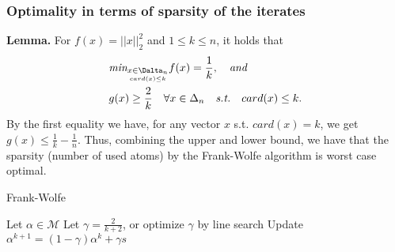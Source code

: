 \documentclass{article}
\begin{document}
\subsubsection{Optimality in terms of sparsity of the iterates}
\textbf{Lemma.} For $f(x)= ||x||_{2}^{2}$ and $1\leq k\leq n$, it holds that
\begin{equation*}
\begin{aligned}
      &\textit{min}_{\underset{card(x)\leq
      k}{x\in\Dalta_{n}}}f(x)= \frac{1}{k},\quad\textit{and}\\
      &g(x)\geq \frac{2}{k}\quad\forall x\in\Delta_{n}\quad\textit{s.t.}\quad card(x)\leq k. 
\end{aligned}    
\end{equation*}
By the first equality we have, for any vector $x$ s.t. $card(x)= k$, we get $g(x)\leq \frac{1}{k}- \frac{1}{n}$.
Thus, combining the upper and lower bound, we have that the sparsity (number of used atoms) by the Frank-Wolfe algorithm is worst case optimal.
\begin{algorithm}[tb]
   \caption{Frank-Wolfe}
   \label{alg:example}
\begin{algorithmic}
   \STATE Let $\alpha\in\mathcal{M}$
   \STATE Let $\gamma = \frac{2}{k+2}$, or optimize $\gamma$ by line search
   \STATE Update $\alpha^{k+1}= (1-\gamma)\alpha^{k}+ \gamma s$
   \ENDFOR
\end{algorithmic}
\end{algorithm}
\end{document}
